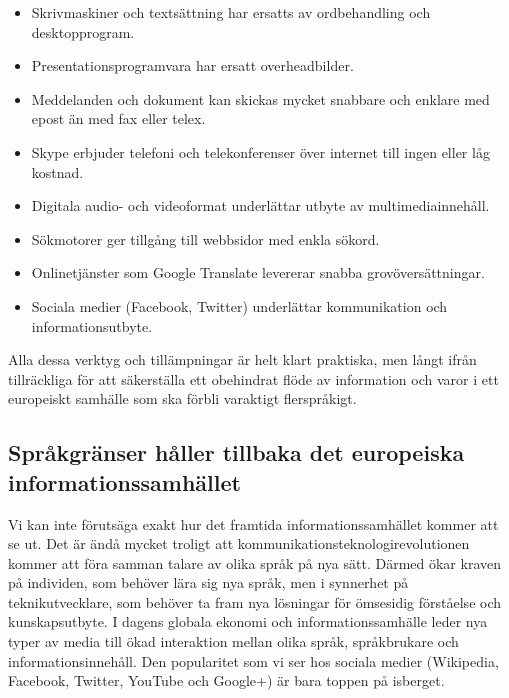\begin{multicols}{2}
\begin{itemize}
\item Skrivmaskiner och textsättning har ersatts av ordbehandling och
  desktopprogram.
\item Presentations\-programvara har ersatt over\-head\-bilder.
\item Meddelanden och dokument kan skickas mycket snabbare och enklare
  med epost än med fax eller telex.
\item Skype erbjuder telefoni och telekonferenser över internet till
  ingen eller låg kostnad.
\item Digitala audio- och videoformat underlättar utbyte av
  multi\-media\-innehåll.
\item Sökmotorer ger tillgång till webbsidor med enkla sökord.
\item Online\-tjänster som Google Translate levererar snabba
  grovöversättningar.
\item Sociala medier (Facebook, Twitter) underlättar kommunika\-tion
  och informations\-utbyte.
\end{itemize}

Alla dessa verktyg och tillämpningar är helt klart praktiska, men
långt ifrån tillräckliga för att säkerställa ett obehindrat flöde av
information och varor i ett europeiskt samhälle som ska förbli
varaktigt flerspråkigt.

\subsection{Språkgränser håller tillbaka det europe\-iska informa\-tions\-sam\-hället}
  
Vi kan inte förutsäga exakt hur det framtida in\-forma\-tions\-samhället
kommer att se ut. Det är ändå mycket troligt att
kom\-munika\-tions\-tekno\-logi\-revolu\-tion\-en kommer att föra
samman talare av olika språk på nya sätt. Därmed ökar kraven på
individen, som behöver lära sig nya språk, men i synnerhet på
teknik\-ut\-vecklare, som behöver ta fram nya lösningar för ömsesidig
förståelse och kunskapsutbyte. I dagens globala ekonomi och informationssamhälle leder nya typer av
media till ökad interaktion mellan olika språk, språk\-brukare och
informationsinnehåll. Den popularitet som vi ser hos sociala medier
(Wikipedia, Facebook, Twitter, YouTube och Google+) är bara toppen på
isberget.



\end{multicols}
